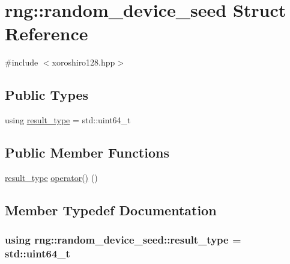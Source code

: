 \hypertarget{structrng_1_1random__device__seed}{}\section{rng\+:\+:random\+\_\+device\+\_\+seed Struct Reference}
\label{structrng_1_1random__device__seed}


{\ttfamily \#include $<$xoroshiro128.\+hpp$>$}

\subsection*{Public Types}
\begin{DoxyCompactItemize}
\item 
using \hyperlink{structrng_1_1random__device__seed_a31452aa9f8fb764c7eee250b54775c53}{result\+\_\+type} = std\+::uint64\+\_\+t
\end{DoxyCompactItemize}
\subsection*{Public Member Functions}
\begin{DoxyCompactItemize}
\item 
\hyperlink{structrng_1_1random__device__seed_a31452aa9f8fb764c7eee250b54775c53}{result\+\_\+type} \hyperlink{structrng_1_1random__device__seed_a9bf119b0ae7f3d1867b47a8e16ab3c78}{operator()} ()
\end{DoxyCompactItemize}


\subsection{Member Typedef Documentation}
\subsubsection[{\texorpdfstring{result\+\_\+type}{result_type}}]{\setlength{\rightskip}{0pt plus 5cm}using {\bf rng\+::random\+\_\+device\+\_\+seed\+::result\+\_\+type} =  std\+::uint64\+\_\+t}\hypertarget{structrng_1_1random__device__seed_a31452aa9f8fb764c7eee250b54775c53}{}\label{structrng_1_1random__device__seed_a31452aa9f8fb764c7eee250b54775c53}



